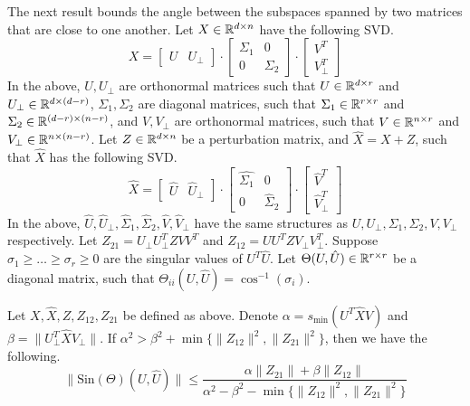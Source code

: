 The next result bounds the angle between the subspaces
spanned by two matrices that are close to one another.
Let $X \in \mathbb{R}^{d\times n}$ have the following SVD.
$$X=
    \begin{bmatrix}
        U & U_{\bot}
    \end{bmatrix} \cdot
    \begin{bmatrix}
        \Sigma_1 & 0\\
        0 & \Sigma_2
    \end{bmatrix} \cdot
    \begin{bmatrix}
        V^T\\
        V_{\bot}^T
    \end{bmatrix}$$
In the above, $U,U_{\bot}$ are orthonormal matrices
such that $U\in \mathbb{R}^{d\times r}$ and $U_{\bot}\in \mathbb{R}^{d \times (d-r)}$,
$\Sigma_1,\Sigma_2$ are diagonal matrices, such that
$\Sigma_1 \in \mathbb{R}^{r \times r}$ and $\Sigma_2 \in \mathbb{R}^{(d-r)\times(n-r)}$,
and $V,V_{\bot}$ are orthonormal matrices, such that
$V \in \mathbb{R}^{n \times r}$ and $V_{\bot} \in \mathbb{R}^{n \times (n-r)}$.
Let $Z \in \mathbb{R}^{d\times n}$ be a perturbation matrix,
and $\hat{X} =  X + Z$, such that $\hat{X}$ has the
following SVD.
$$\hat{X}=
    \begin{bmatrix}
        \hat{U} & \hat{U}_{\bot}
    \end{bmatrix} \cdot
    \begin{bmatrix}
        \hat{\Sigma_1} & 0\\
        0 & \hat{\Sigma}_2
    \end{bmatrix} \cdot
    \begin{bmatrix}
        \hat{V}^T\\
        \hat{V}_{\bot}^T
    \end{bmatrix}$$
In the above, $\hat{U},\hat{U}_{\bot},\hat{\Sigma}_1,\hat{\Sigma}_2,\hat{V},\hat{V}_{\bot}$
have the same structures as $U,U_{\bot},\Sigma_1,\Sigma_2,V,V_{\bot}$
respectively. Let $Z_{21} = U_{\bot}U_{\bot}^T Z VV^T$ and
$Z_{12} = UU^T Z V_{\bot}V_{\bot}^T$. Suppose $\sigma_1\geq\dots\geq\sigma_r\geq0$
are the singular values of $U^T\hat{U}$. Let
$\Theta(U,\hat{U}) \in \mathbb{R}^{r\times r}$ be a diagonal matrix,
such that $\Theta_{ii}(U,\hat{U}) = \cos^{-1}(\sigma_i)$.

\begin{lemma}\label{lem:sin-theta}
    Let $X,\hat{X},Z,Z_{12},Z_{21}$ be defined as above.
    Denote $\alpha = s_{\min}(U^T \hat{X} V)$ and
    $\beta = \|U_{\bot}^T \hat{X} V_{\bot}\|$.
    If $\alpha^2 > \beta^2 + \min\{\|Z_{12}\|^2,\|Z_{21}\|^2\}$,
    then we have the following.
    $$\|\text{Sin}(\Theta)(U,\hat{U})\| \leq
        \frac{\alpha\|Z_{21}\|+\beta\|Z_{12}\|}
        {\alpha^2-\beta^2-\min\{\|Z_{12}\|^2,\|Z_{21}\|^2\}}$$
\end{lemma}

